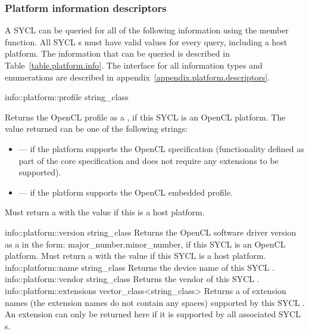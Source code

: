 \subsubsection{Platform information descriptors}

A SYCL  can be queried for all of the following information using the  member function. All SYCL s must have valid values for every query, including a host platform. The information that can be queried is described in Table~\ref{table.platform.info}. The interface for all information types and enumerations are described in appendix~\ref{appendix.platform.descriptors}.



  \addInfoRow
    {info::platform::profile}
    {string_class}
    {
      Returns the OpenCL profile as a , if this SYCL  is an OpenCL platform. The value returned can be one of the following strings:
      \begin{itemize}
        \item {} --- if the platform supports the OpenCL specification (functionality defined as part of the core specification and does not require any extensions to be supported).
        \item {} --- if the platform supports the OpenCL embedded profile.
      \end{itemize}
    Must return a  with the value  if this is a host platform.
    }
    \addInfoRow
    {info::platform::version}
    {string_class}
    {
      Returns the OpenCL software driver version as a  in the form: major_number.minor_number, if this SYCL  is an OpenCL platform. Must return a  with the value  if this SYCL  is a host platform.
    }
  \addInfoRow
    {info::platform::name}
    {string_class}
    {
      Returns the device name of this SYCL .
    }
  \addInfoRow
    {info::platform::vendor}
    {string_class}
    {
      Returns the vendor of this SYCL .
    }
  \addInfoRow
    {info::platform::extensions}
    {vector_class<string_class>}
    {
      Returns a  of extension names (the extension names do not contain any spaces) supported by this SYCL . An extension can only be returned here if it is supported by all associated SYCL s.
    }
\completeTable


